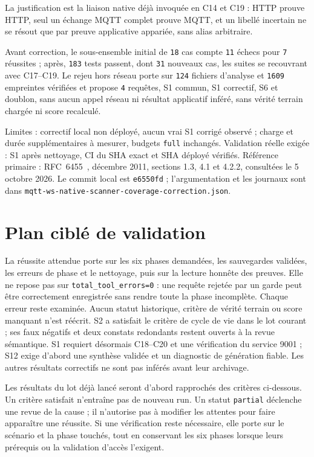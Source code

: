 \documentclass[11pt,a4paper]{article}
\newcommand{\code}[1]{{\urlstyle{tt}\nolinkurl{#1}}}
\begin{document}
La justification est la liaison native d\'ej\`a invoqu\'ee en C14 et C19 : HTTP prouve HTTP, seul un \'echange MQTT complet prouve MQTT, et un libell\'e incertain ne se r\'esout que par preuve applicative appari\'ee, sans alias arbitraire.

Avant correction, le sous-ensemble initial de \code{18} cas compte \code{11} \'echecs pour \code{7} r\'eussites ; apr\`es, \code{183} tests passent, dont \code{31} nouveaux cas, les suites se recouvrant avec C17--C19. Le rejeu hors r\'eseau porte sur \code{124} fichiers d'analyse et \code{1609} empreintes v\'erifi\'ees et propose \code{4} requ\^etes, S1 commun, S1 correctif, S6 et doublon, sans aucun appel r\'eseau ni r\'esultat applicatif inf\'er\'e, sans v\'erit\'e terrain charg\'ee ni score recalcul\'e.

Limites : correctif local non d\'eploy\'e, aucun vrai S1 corrig\'e observ\'e ; charge et dur\'ee suppl\'ementaires \`a mesurer, budgets \code{full} inchang\'es. Validation r\'eelle exig\'ee : S1 apr\`es nettoyage, CI du SHA exact et SHA d\'eploy\'e v\'erifi\'es. R\'ef\'erence primaire : RFC~6455~\cite{rfc6455}, d\'ecembre 2011, sections 1.3, 4.1 et 4.2.2, consult\'ees le 5 octobre 2026. Le commit local est \code{e6550fd} ; l'argumentation et les journaux sont dans \code{mqtt-ws-native-scanner-coverage-correction.json}.


\section{Plan ciblé de validation}
\label{sec:plan}

La réussite attendue porte sur les six phases demandées, les sauvegardes validées, les erreurs de phase et le nettoyage, puis sur la lecture honnête des preuves. Elle ne repose pas sur \code{total_tool_errors=0} : une requête rejetée par un garde peut être correctement enregistrée sans rendre toute la phase incomplète. Chaque erreur reste examinée. Aucun statut historique, critère de vérité terrain ou score manquant n'est réécrit. S2 a satisfait le critère de cycle de vie dans le lot courant ; ses faux négatifs et deux constats redondants restent ouverts à la revue sémantique. S1 requiert désormais C18--C20 et une vérification du service 9001 ; S12 exige d'abord une synthèse validée et un diagnostic de génération fiable. Les autres résultats correctifs ne sont pas inférés avant leur archivage.

Les résultats du lot déjà lancé seront d'abord rapprochés des critères ci-dessous. Un critère satisfait n'entraîne pas de nouveau run. Un statut \code{partial} déclenche une revue de la cause ; il n'autorise pas à modifier les attentes pour faire apparaître une réussite. Si une vérification reste nécessaire, elle porte sur le scénario et la phase touchés, tout en conservant les six phases lorsque leurs prérequis ou la validation d'accès l'exigent.
\end{document}
